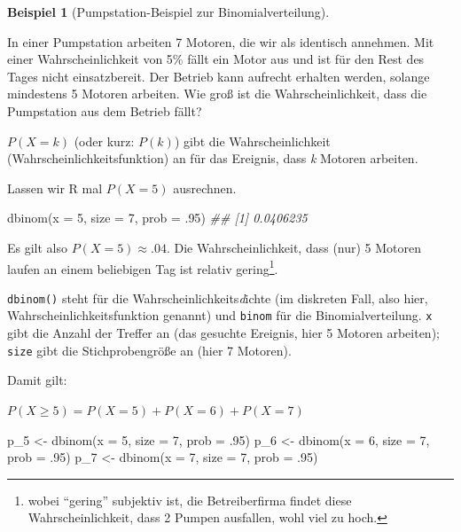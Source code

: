 \documentclass[
  a4paper,
  DIV=11]{scrreprt}
\newenvironment{Shaded}{\begin{snugshade}}{\end{snugshade}}
\newcommand{\AttributeTok}[1]{\textcolor[rgb]{0.40,0.45,0.13}{#1}}
\newcommand{\DecValTok}[1]{\textcolor[rgb]{0.68,0.00,0.00}{#1}}
\newcommand{\DocumentationTok}[1]{\textcolor[rgb]{0.37,0.37,0.37}{\textit{#1}}}
\newcommand{\FunctionTok}[1]{\textcolor[rgb]{0.28,0.35,0.67}{#1}}
\newcommand{\NormalTok}[1]{\textcolor[rgb]{0.00,0.23,0.31}{#1}}
\newcommand{\OtherTok}[1]{\textcolor[rgb]{0.00,0.23,0.31}{#1}}
\theoremstyle{definition}
\newtheorem{example}{Beispiel}[chapter]
\theoremstyle{remark}
\begin{document}
\leavevmode{}%
\begin{example}[Pumpstation-Beispiel zur
Binomialverteilung]\label{exm-binom}

In einer Pumpstation arbeiten 7 Motoren, die wir als identisch annehmen.
Mit einer Wahrscheinlichkeit von 5\% fällt ein Motor aus und ist für den
Rest des Tages nicht einsatzbereit. Der Betrieb kann aufrecht erhalten
werden, solange mindestens 5 Motoren arbeiten. Wie groß ist die
Wahrscheinlichkeit, dass die Pumpstation aus dem Betrieb fällt?

\(P(X=k)\) (oder kurz: \(P(k)\)) gibt die Wahrscheinlichkeit
(Wahrscheinlichkeitsfunktion) an für das Ereignis, dass \emph{k} Motoren
arbeiten.

Lassen wir R mal \(P(X=5)\) ausrechnen.

\begin{Shaded}
\begin{Highlighting}[]
\FunctionTok{dbinom}\NormalTok{(}\AttributeTok{x =} \DecValTok{5}\NormalTok{, }\AttributeTok{size =} \DecValTok{7}\NormalTok{, }\AttributeTok{prob =}\NormalTok{ .}\DecValTok{95}\NormalTok{)}
\DocumentationTok{\#\# [1] 0.0406235}
\end{Highlighting}
\end{Shaded}

Es gilt also \(P(X=5) \approx .04\). Die Wahrscheinlichkeit, dass (nur)
5 Motoren laufen an einem beliebigen Tag ist relativ gering\footnote{wobei
  ``gering'' subjektiv ist, die Betreiberfirma findet diese
  Wahrscheinlichkeit, dass 2 Pumpen ausfallen, wohl viel zu hoch.}.

\texttt{dbinom()} steht für die Wahrscheinlichkeits\emph{d}ichte (im
diskreten Fall, also hier, Wahrscheinlichkeitsfunktion genannt) und
\texttt{binom} für die Binomialverteilung. \texttt{x} gibt die Anzahl
der Treffer an (das gesuchte Ereignis, hier 5 Motoren arbeiten);
\texttt{size} gibt die Stichprobengröße an (hier 7 Motoren).

Damit gilt:

\(P(X\ge 5) = P(X=5) + P(X=6) + P(X=7)\)

\begin{Shaded}
\begin{Highlighting}[]
\NormalTok{p\_5 }\OtherTok{\textless{}{-}} \FunctionTok{dbinom}\NormalTok{(}\AttributeTok{x =} \DecValTok{5}\NormalTok{, }\AttributeTok{size =} \DecValTok{7}\NormalTok{, }\AttributeTok{prob =}\NormalTok{ .}\DecValTok{95}\NormalTok{)}
\NormalTok{p\_6 }\OtherTok{\textless{}{-}} \FunctionTok{dbinom}\NormalTok{(}\AttributeTok{x =} \DecValTok{6}\NormalTok{, }\AttributeTok{size =} \DecValTok{7}\NormalTok{, }\AttributeTok{prob =}\NormalTok{ .}\DecValTok{95}\NormalTok{)}
\NormalTok{p\_7 }\OtherTok{\textless{}{-}} \FunctionTok{dbinom}\NormalTok{(}\AttributeTok{x =} \DecValTok{7}\NormalTok{, }\AttributeTok{size =} \DecValTok{7}\NormalTok{, }\AttributeTok{prob =}\NormalTok{ .}\DecValTok{95}\NormalTok{)}


\end{Highlighting}
\end{Shaded}
\end{example}
\end{document}
